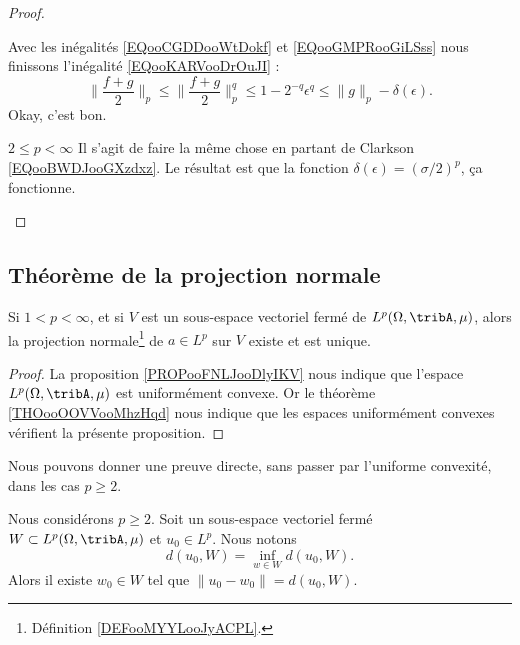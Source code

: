 \begin{proof}
\begin{subproof}
            Avec les inégalités \eqref{EQooCGDDooWtDokf} et \ref{EQooGMPRooGiLSss} nous finissons l'inégalité \eqref{EQooKARVooDrOuJI} :
            \begin{equation}
                \| \frac{ f+g }{2} \|_p\leq \| \frac{ f+g }{2} \|_p^q\leq 1-2^{-q}\epsilon^q\leq \| g \|_p-\delta(\epsilon).
            \end{equation}
            Okay, c'est bon.

        \item[\( 2\leq p<\infty\)]
            Il s'agit de faire la même chose en partant de Clarkson \eqref{EQooBWDJooGXzdxz}. Le résultat est que la fonction \( \delta(\epsilon)=(\sigma/2)^p\), ça fonctionne.
    \end{subproof}
\end{proof}

\subsection{Théorème de la projection normale}

\begin{proposition}     \label{PROPooTZMRooCvQtGg}
    Si \( 1<p<\infty\), et si \( V\) est un sous-espace vectoriel fermé de \( L^p(\Omega,\tribA, \mu)\), alors la projection normale\footnote{Définition \ref{DEFooMYYLooJyACPL}.} de \( a\in L^p\) sur \( V\) existe et est unique.
\end{proposition}

\begin{proof}
    La proposition \ref{PROPooFNLJooDlyIKV} nous indique que l'espace \( L^p(\Omega,\tribA, \mu)\) est uniformément convexe. Or le théorème \ref{THOooOOVVooMhzHqd} nous indique que les espaces uniformément convexes vérifient la présente proposition.
\end{proof}

Nous pouvons donner une preuve directe, sans passer par l'uniforme convexité, dans les cas \( p\geq 2\).
\begin{theorem} \label{THOooRJFUooQivDKm}
    Nous considérons \( p\geq 2\). Soit un sous-espace vectoriel fermé \( W\subset L^p(\Omega,\tribA,\mu)\) et \( u_0\in L^p\). Nous notons
    \begin{equation}
        d(u_0,W)=\inf_{w\in W}d(u_0,W).
    \end{equation}
    Alors il existe \( w_0\in W\) tel que \( \| u_0-w_0 \|=d(u_0,W)\).
\end{theorem}

